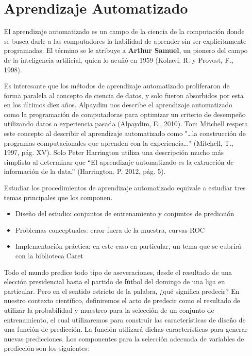 \pagebreak
\section{Aprendizaje Automatizado}
El aprendizaje automatizado es un campo de la ciencia de la computación donde se busca darle a las computadores la habilidad de aprender sin ser explicitamente programadas. El término se le atribuye a \textbf{Arthur Samuel}, un pionero del campo de la inteligencia artificial, quien lo acuñó en 1959 (Kohavi, R. y Provost, F., 1998).

Es interesante que los métodos de aprendizaje automatizado proliferaron de forma paralela al concepto de ciencia de datos, y solo fueron absorbidos por esta en los últimos diez años. Alpaydim nos describe el aprendizaje automatizado como la programación de computadoras para optimizar un criterio de desempeño utilizando datos o experiencia pasada (Alpaydim, E., 2010). Tom Mitchell respeta este concepto al describir el aprendizaje automatizado como "\ldots la construcción de programas computacionales que aprenden con la experiencia\ldots” (Mitchell, T., 1997, pág. XV). Solo Peter Harrington utiliza una descripción mucho más simplista al determinar que “El aprendizaje automatizado es la extracción de información de la data.” (Harrington, P. 2012, pág. 5).

Estudiar los procedimientos de aprendizaje automatizado equivale a estudiar tres temas principales que los componen.

\begin{itemize}
	\item Diseño del estudio: conjuntos de entrenamiento y conjuntos de predicción
	\item Problemas conceptuales: error fuera de la muestra, curvas ROC
	\item Implementación práctica: en este caso en particular, un tema que se cubrirá con la biblioteca Caret
\end{itemize}

Todo el mundo predice todo tipo de aseveraciones, desde el resultado de una elección presidencial hasta el partido de fútbol del domingo de una liga en particular. Pero en el sentido estricto de la palabra, ¿qué significa predecir? En nuestro contexto científico, definiremos el acto de predecir como el resultado de utilizar la probabilidad y muestreo para la selección de un conjunto de entrenamiento, el cual utilizaremos para construir las características de diseño de una función de predicción. La función utilizará dichas características para generar nuevas predicciones.  Los componentes para la selección adecuada de variables de predicción son los siguientes:

